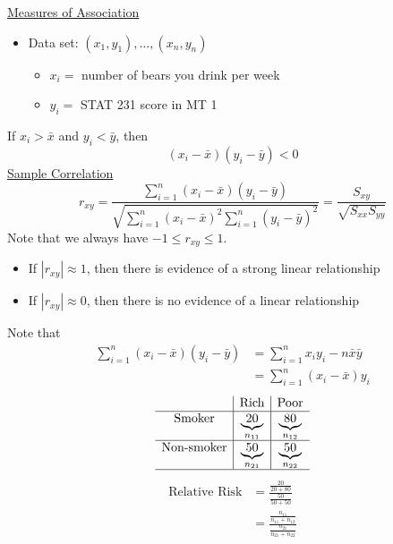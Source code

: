\underline{Measures of Association}
\begin{itemize}
    \item Data set: $ (x_1,y_1),\ldots ,(x_n,y_n) $
          \begin{itemize}
              \item $ x_i= $ number of bears you drink per week
              \item $ y_i= $ STAT 231 score in MT 1
          \end{itemize}
\end{itemize}
If $ x_i>\bar{x} $ and $ y_i<\bar{y} $, then
\[ (x_i-\bar{x})(y_i-\bar{y})<0 \]
\underline{Sample Correlation}
\[ r_{xy}=\frac{\sum\limits_{i=1}^{n} (x_i-\bar{x})(y_i-\bar{y})}{
        \sqrt{\sum\limits_{i=1}^{n} (x_i-\bar{x})^2\sum\limits_{i=1}^{n}
            (y_i-\bar{y})^2}
    }=\frac{S_{xy}}{\sqrt{S_{xx}S_{yy}}}  \]
Note that we always have $ -1\leqslant r_{xy}\leqslant 1 $.
\begin{itemize}
    \item If $ |r_{xy}|\approx 1 $, then there is evidence of a strong linear relationship
    \item If $ |r_{xy}|\approx 0 $, then there is no evidence of a linear relationship
\end{itemize}
Note that
\begin{align*}
    \sum\limits_{i=1}^{n} (x_i-\bar{x})(y_i-\bar{y})
     & =\sum\limits_{i=1}^{n} x_i y_i-n\bar{x}\bar{y} \\
     & =\sum\limits_{i=1}^{n} (x_i-\bar{x})y_i
\end{align*}
\[ \begin{array}{c|c|c}
                          & \text{Rich}              & \text{Poor}              \\
        \hline
        \text{Smoker}     & \underbrace{20}_{n_{11}} & \underbrace{80}_{n_{12}} \\
        \hline
        \text{Non-smoker} & \underbrace{50}_{n_{21}} & \underbrace{50}_{n_{22}} \\
        \hline
    \end{array} \]
\begin{align*}
    \text{Relative Risk}
     & =\frac{\frac{20}{20+80}}{\frac{50}{50+50}}                         \\
     & =\frac{\frac{n_{11}}{n_{11}+n_{12}}}{\frac{n_{21}}{n_{21}+n_{22}}}
\end{align*}
